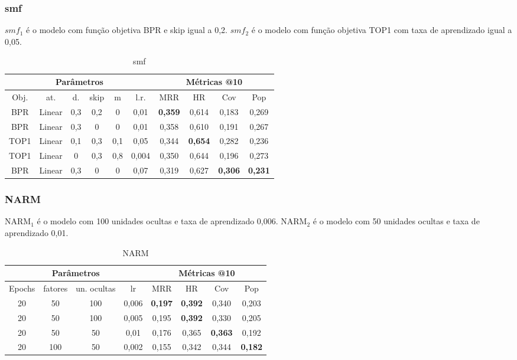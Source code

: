 \subsubsection{smf}
$smf_{1}$ é o modelo com função objetiva BPR e skip igual a 0,2.
$smf_{2}$ é o modelo com função objetiva TOP1 com taxa de aprendizado igual a 0,05.
\begin{table}[htbp]
  \centering
  \begin{tabular}{|c|c|c|c|c|c|c|c|c|c|}
    \hline
      \multicolumn{6}{|c|}{Parâmetros} & \multicolumn{4}{c|}{Métricas @10} \\
      \hline
      Obj. & at. & d. & skip & m & l.r. & MRR & HR & Cov & Pop \\
      \hline
      BPR & Linear & 0,3 & 0,2 & 0 & 0,01 & \textbf{0,359} & 0,614 & 0,183 & 0,269 \\
      \hline
      BPR & Linear & 0,3 & 0 & 0 & 0,01 & 0,358 & 0,610 & 0,191 & 0,267 \\
      \hline
      TOP1 & Linear & 0,1 & 0,3 & 0,1 & 0,05 & 0,344 & \textbf{0,654} & 0,282 & 0,236 \\
      \hline
      TOP1 & Linear & 0 & 0,3 & 0,8 & 0,004 & 0,350 & 0,644 & 0,196 & 0,273 \\
      \hline
      BPR & Linear & 0,3 & 0 & 0 & 0,07 & 0,319 & 0,627 & \textbf{0,306} & \textbf{0,231} \\
      \hline
      \end{tabular}
      \caption{smf}
\end{table}

\subsubsection{NARM}
$\text{NARM}_{1}$ é o modelo com 100 unidades ocultas e taxa de aprendizado 0,006.
$\text{NARM}_{2}$ é o modelo com 50 unidades ocultas e taxa de aprendizado 0,01.

\begin{table}[htbp]
  \centering
  \begin{tabular}{|c|c|c|c|c|c|c|c|}
    \hline
      \multicolumn{4}{|c|}{Parâmetros} & \multicolumn{4}{c|}{Métricas @10} \\
      \hline
      Epochs & fatores & un. ocultas & lr & MRR & HR & Cov & Pop \\
      \hline
      20 & 50 & 100 & 0,006 & \textbf{0,197} & \textbf{0,392} & 0,340 & 0,203 \\
      \hline
      20 & 50 & 100 & 0,005 & 0,195 & \textbf{0,392} & 0,330 & 0,205 \\
      \hline
      20 & 50 & 50 & 0,01 & 0,176 & 0,365 & \textbf{0,363} & 0,192 \\
      \hline
      20 & 100 & 50 & 0,002 & 0,155 & 0,342 & 0,344 & \textbf{0,182} \\
      \hline
      \end{tabular}
      \caption{NARM}
\end{table}

